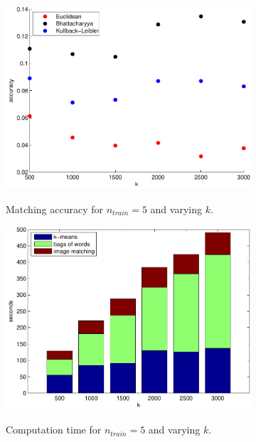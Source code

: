 \documentclass[11pt,a4paper]{article}
\begin{document}
\begin{figure}[H]
    \centering
    \begin{subfigure}[t]{0.48\textwidth}
        \includegraphics[width=\textwidth]{images/results_k.pdf}
        \label{fig:results_k}
        \caption{Matching accuracy for $n_{train} = 5$ and varying $k$.}
    \end{subfigure}
    \begin{subfigure}[t]{0.48\textwidth}
        \includegraphics[width=\textwidth]{images/results_k_time.pdf}
        \label{fig:results_k_time}
        \caption{Computation time for $n_{train} = 5$ and varying $k$.}
    \end{subfigure}
    \begin{subfigure}[t]{0.48\textwidth}

\end{subfigure}
\end{figure}
\end{document}

